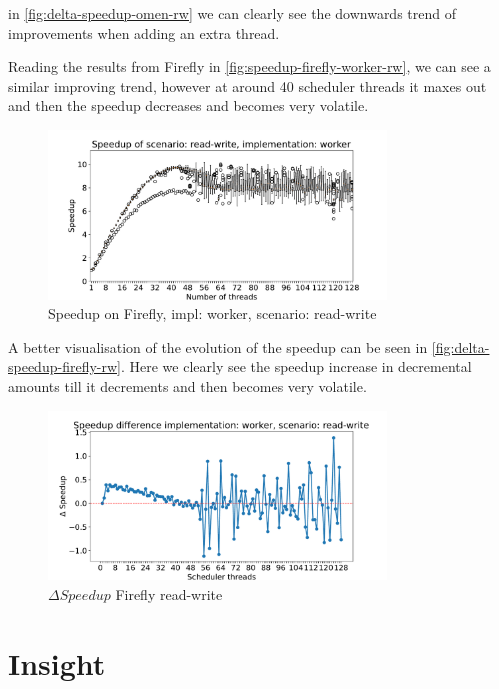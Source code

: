 \documentclass{article}
\begin{document}
in \autoref{fig:delta-speedup-omen-rw} we can clearly see the downwards trend of
improvements when adding an extra thread. \par
Reading the results from Firefly in \autoref{fig:speedup-firefly-worker-rw}, we can see a similar improving trend, however at around 40 scheduler threads it maxes out and then the speedup decreases and becomes very volatile.
\begin{figure}[H]
	\centering
	\includegraphics[width=0.8\textwidth]{boxplots/firefly/boxplot-speedup-of-scenario-read-write-implementation-worker.pdf}
	\caption{Speedup on Firefly, impl: worker, scenario: read-write}
	\label{fig:speedup-firefly-worker-rw}
\end{figure}
A better visualisation of the evolution of the speedup can be seen in
\autoref{fig:delta-speedup-firefly-rw}. Here we clearly see the speedup increase
in decremental amounts till it decrements and then becomes very volatile.
\begin{figure}[H]
	\centering
	\includegraphics[width=0.8\textwidth]{plot/firefly/plot-speedup-difference-implementation-worker-scenario-read-write.pdf}
	\caption{$\Delta Speedup$ Firefly read-write}
	\label{fig:delta-speedup-firefly-rw}
\end{figure}
\section{Insight}
\end{document}
